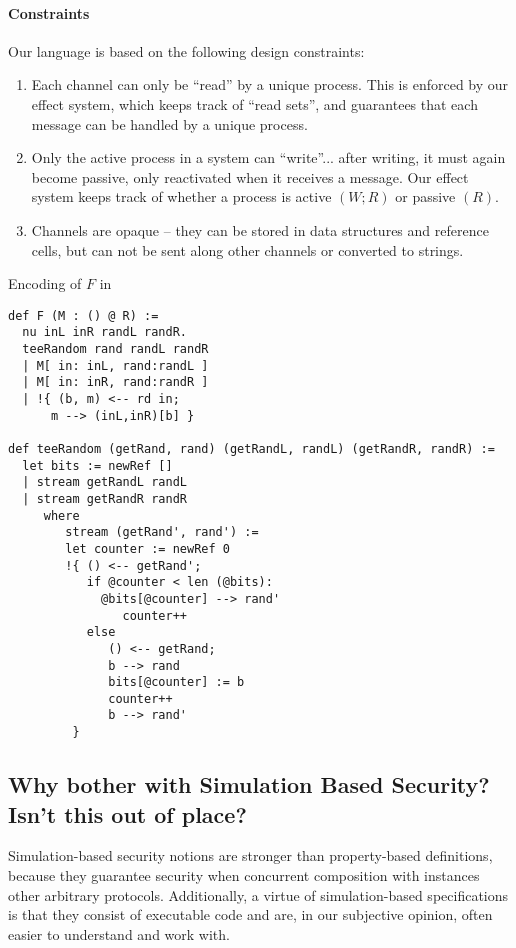 \paragraph{Constraints}
Our language is based on the following design constraints:
\begin{enumerate}
\item Each channel can only be “read” by a unique process. This is enforced by our effect system, which keeps track of “read sets”, and guarantees that each message can be handled by a unique process.
\item Only the active process in a system can “write”... after writing, it must again become passive, only reactivated when it receives a message. Our effect system keeps track of whether a process is active $(W; R)$ or passive $(R)$.
\item Channels are opaque -- they can be stored in data structures and reference cells, but can not be sent along other channels or converted to strings.
\end{enumerate}



Encoding of $F$ in \lang
\begin{figure*}
\begin{lstlisting} 
def F (M : () @ R) :=
  nu inL inR randL randR. 
  teeRandom rand randL randR
  | M[ in: inL, rand:randL ]
  | M[ in: inR, rand:randR ]
  | !{ (b, m) <-- rd in;
      m --> (inL,inR)[b] }

def teeRandom (getRand, rand) (getRandL, randL) (getRandR, randR) :=
  let bits := newRef []
  | stream getRandL randL
  | stream getRandR randR
     where
        stream (getRand', rand') :=
        let counter := newRef 0
        !{ () <-- getRand';
           if @counter < len (@bits):
             @bits[@counter] --> rand'
                counter++
           else
              () <-- getRand; 
              b --> rand
              bits[@counter] := b
              counter++
              b --> rand'
         }
\end{lstlisting}
\end{figure*}





\subsection{Why bother with Simulation Based Security? Isn't this out of place?}
Simulation-based security notions are stronger than property-based definitions, because they guarantee security when concurrent composition with instances other arbitrary protocols.
Additionally, a virtue of simulation-based specifications is that they consist of executable code and are, in our subjective opinion, often easier to understand and work with.

